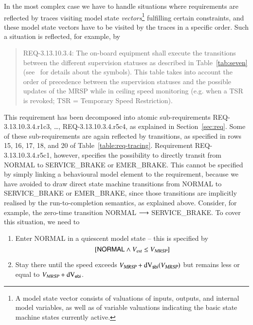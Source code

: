In the  most complex case we have to handle situations where requirements are reflected by traces visiting model state {\it vectors}\footnote{A model state vector consists of valuations of  inputs, outputs, and internal model variables, as well as of variable valuations indicating the basic state machine states currently active.} fulfilling certain constraints, and these model state vectors have to be visited by the traces in a specific order. Such a situation is reflected, for example, by 
\begin{quote}
REQ-3.13.10.3.4:
The on-board equipment shall execute the transitions between the different supervision statuses as described in Table~\ref{tab:seven} (see~\cite[4.6.1]{ETCSSRS-Principles} for details about the symbols). This table takes into account the order of precedence between the supervision statuses and the possible updates of the MRSP while in ceiling speed monitoring (e.g. when a TSR is revoked; TSR = Temporary Speed Restriction).
\end{quote}
This requirement   has been decomposed into atomic sub-requirements
REQ-3.13.10.3.4.r1c3, \ldots, REQ-3.13.10.3.4.r5c4, as explained in Section~\ref{sec:req}.
Some of these sub-requirements are again 
reflected by transitions, as specified in rows 15, 16, 17, 18, and 20 of Table~\ref{table:req-tracing}. Requirement REQ-3.13.10.3.4.r5c1, however, specifies the possibility to directly transit from {\sf NORMAL} to {\sf SERVICE\_BRAKE} or {\sf EMER\_BRAKE}. This cannot be specified by simply linking a behavioural model element to the requirement, because we have avoided to draw direct state machine transitions from {\sf NORMAL} to {\sf SERVICE\_BRAKE} or {\sf EMER\_BRAKE}, since those transitions are implicitly realised by the run-to-completion semantics, as explained above.
Consider, for example, the zero-time transition
{\sf NORMAL} $\longrightarrow$ {\sf SERVICE\_BRAKE}. To cover this situation, we need to 
\begin{enumerate}
\item Enter   {\sf NORMAL} in a quiescent model state -- this is specified by 
$$[\mathsf{NORMAL} \wedge {V_{\text{\sl est}}} \le {V_{\text{\sl MRSP}}}]$$
\item Stay there until the speed exceeds ${V_{\text{\sl MRSP}}} + \text{dV}_{\mathsf{sbi}}({V_{\text{\sl MRSP}}})$ but remains less or equal to ${V_{\text{\sl MRSP}}}+\text{dV}_{\mathsf{ebi}}$.
\end{enumerate}
